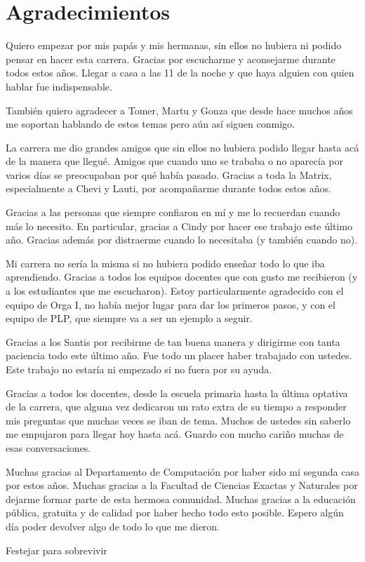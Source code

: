 \chapter*{Agradecimientos}

Quiero empezar por mis papás y mis hermanas, sin ellos no hubiera ni podido pensar en hacer esta carrera. 
Gracias por escucharme y aconsejarme durante todos estos años. 
Llegar a casa a las 11 de la noche y que haya alguien con quien hablar fue indispensable.

También quiero agradecer a Tomer, Martu y Gonza que desde hace muchos años me soportan hablando de estos temas pero aún así siguen conmigo.

La carrera me dio grandes amigos que sin ellos no hubiera podido llegar hasta acá de la manera que llegué. 
Amigos que cuando uno se trababa o no aparecía por varios días se preocupaban por qué había pasado. 
Gracias a toda la Matrix, especialmente a Chevi y Lauti, por acompañarme durante todos estos años.

Gracias a las personas que siempre confiaron en mí y me lo recuerdan cuando más lo necesito.
En particular, gracias a Cindy por hacer ese trabajo este último año. 
Gracias además por distraerme cuando lo necesitaba (y también cuando no).

\smallbreak

Mi carrera no sería la misma si no hubiera podido enseñar todo lo que iba aprendiendo. 
Gracias a todos los equipos docentes que con gusto me recibieron (y a los estudiantes que me escucharon). 
Estoy particularmente agradecido con el equipo de Orga I, no había mejor lugar para dar los primeros pasos, y con el equipo de PLP, que siempre va a ser un ejemplo a seguir.

Gracias a los Santis por recibirme de tan buena manera y dirigirme con tanta paciencia todo este último año. 
Fue todo un placer haber trabajado con ustedes.
Este trabajo no estaría ni empezado si no fuera por su ayuda.

Gracias a todos los docentes, desde la escuela primaria hasta la última optativa de la carrera, que alguna vez dedicaron un rato extra de su tiempo a responder mis preguntas que muchas veces se iban de tema. 
Muchos de ustedes sin saberlo me empujaron para llegar hoy hasta acá. 
Guardo con mucho cariño muchas de esas conversaciones.

\smallbreak

Muchas gracias al Departamento de Computación por haber sido mi segunda casa por estos años. Muchas gracias a la Facultad de Ciencias Exactas y Naturales por dejarme formar parte de esta hermosa comunidad.
Muchas gracias a la educación pública, gratuita y de calidad por haber hecho todo esto posible.
Espero algún día poder devolver algo de todo lo que me dieron.



\bigskip


\begin{itshape}
\begin{flushright}

Festejar para sobrevivir

\end{flushright}
\end{itshape}